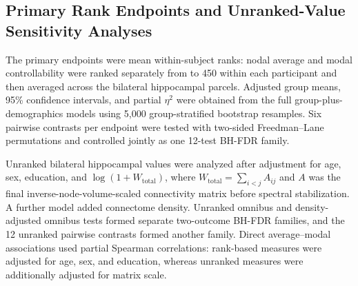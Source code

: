 \documentclass{article}
\providecommand{\DIFaddtex}[1]{{\protect\color{blue}#1}} %
\providecommand{\DIFaddbegin}{} %
\providecommand{\DIFaddend}{} %
\providecommand{\DIFadd}[1]{\texorpdfstring{\DIFaddtex{#1}}{#1}} %
\providecommand{\DIFchgtex}[1]{{\setlength{\fboxsep}{0pt}\colorbox{yellow}{\strut #1}}}
\providecommand{\DIFchg}[1]{\texorpdfstring{\DIFchgtex{#1}\allowbreak}{#1}}
\providecommand{\DIFchgbegin}{}
\providecommand{\DIFchgend}{}
\begin{document}
\begingroup
\color{blue}
\def\DIFchg#1{#1}
\def\DIFadd#1{#1}
\let\DIFchgbegin\relax
\let\DIFchgend\relax
\let\DIFaddbegin\relax
\let\DIFaddend\relax
\subsection{\DIFchg{Primary} \DIFchg{Rank} \DIFchg{Endpoints} \DIFchg{and} \DIFchg{Unranked-Value} \DIFchg{Sensitivity} \DIFchg{Analyses}}
\DIFchg{The} \DIFchg{primary} \DIFchg{endpoints} \DIFchg{were} \DIFchg{mean} \DIFchg{within-subject} \DIFchg{ranks:} \DIFchg{nodal} \DIFchg{average} \DIFchg{and} \DIFchg{modal} \DIFchg{controllability} \DIFchg{were} \DIFchg{ranked} \DIFchg{separately} \DIFchg{from} \DIFchgend 1 \DIFchgbegin \DIFchg{to} \DIFchg{450} \DIFchg{within} \DIFchg{each} \DIFchg{participant} \DIFchg{and} \DIFchg{then} \DIFchg{averaged} \DIFchg{across} \DIFchg{the} \DIFchg{bilateral} \DIFchg{hippocampal} \DIFchg{parcels.} \DIFchg{Adjusted} \DIFchg{group} \DIFchg{means,} \DIFchg{95\%} \DIFchg{confidence} \DIFchg{intervals,} \DIFchg{and} \DIFchg{partial} \DIFchg{\(\eta^2\)} \DIFchg{were} \DIFchg{obtained} \DIFchg{from} \DIFchg{the} \DIFchg{full} \DIFchg{group-plus-demographics} \DIFchg{models} \DIFchg{using} \DIFchg{5}\DIFchgend ,000  \DIFchgbegin \DIFchg{group-stratified} \DIFchg{bootstrap} \DIFchg{resamples.} \DIFchg{Six} \DIFchg{pairwise} \DIFchg{contrasts} \DIFchg{per} \DIFchg{endpoint} \DIFchg{were} \DIFchg{tested} \DIFchg{with} \DIFchg{two-sided} \DIFchg{Freedman--Lane} \DIFchg{permutations} \DIFchg{and} \DIFchg{controlled} \DIFchg{jointly} \DIFchg{as} \DIFchg{one} \DIFchg{12-test} \DIFchg{BH-FDR} \DIFchg{family.}


\DIFchg{Unranked} \DIFchg{bilateral} \DIFchg{hippocampal} \DIFchg{values} \DIFchg{were} \DIFchg{analyzed} \DIFchg{after} \DIFchg{adjustment} \DIFchg{for} \DIFchg{age,} \DIFchg{sex,} \DIFchg{education,} \DIFchg{and} \DIFchg{\(\log(1+W_{\mathrm{total}})\),} \DIFchg{where} \DIFchg{\(W_{\mathrm{total}}=\sum_{i<j}A_{ij}\)} \DIFchgend and  \DIFchgbegin \DIFchg{\(A\)} \DIFchg{was} \DIFchg{the} \DIFchg{final} \DIFchg{inverse-node-volume-scaled} \DIFchg{connectivity} \DIFchg{matrix} \DIFchg{before} \DIFchg{spectral} \DIFchg{stabilization.} \DIFchg{A} \DIFchg{further} \DIFchg{model} \DIFchg{added} \DIFchg{connectome} \DIFchg{density.} \DIFchg{Unranked} \DIFchg{omnibus} \DIFchg{and} \DIFchg{density-adjusted} \DIFchg{omnibus} \DIFchg{tests} \DIFchg{formed} \DIFchg{separate} \DIFchg{two-outcome} \DIFchg{BH-FDR} \DIFchg{families,} \DIFchg{and} \DIFchg{the} \DIFchg{12} \DIFchg{unranked} \DIFchg{pairwise} \DIFchg{contrasts} \DIFchg{formed} \DIFchg{another} \DIFchg{family.} \DIFchg{Direct} \DIFchg{average--modal} \DIFchg{associations} \DIFchg{used} \DIFchg{partial} \DIFchg{Spearman} \DIFchg{correlations:} \DIFchg{rank-based} \DIFchg{measures} \DIFchg{were} \DIFchg{adjusted} \DIFchg{for} \DIFchg{age,} \DIFchg{sex,} \DIFchg{and} \DIFchg{education,} \DIFchg{whereas} \DIFchg{unranked} \DIFchg{measures} \DIFchg{were} \DIFchg{additionally} \DIFchg{adjusted} \DIFchg{for} \DIFchg{matrix} \DIFchg{scale.}
\end{document}
